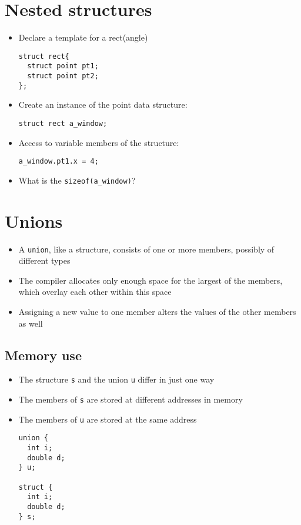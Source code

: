 \documentclass{article}
\begin{document}
\section{Nested structures}
\begin{itemize}
\item Declare a template for a rect(angle)
\begin{verbatim}
struct rect{
  struct point pt1;
  struct point pt2;
};
\end{verbatim}

\item Create an instance of the point data structure:
\begin{verbatim}
struct rect a_window;
\end{verbatim}

\item Access to variable members of the structure:
\begin{verbatim}
a_window.pt1.x = 4;
\end{verbatim}

\item What is the \verb!sizeof(a_window)!?
\end{itemize}




\section{Unions}
\begin{itemize}
\item A \verb!union!, like a structure, consists of one or more members, possibly of different types

\item The compiler allocates only enough space for the largest of the members, which overlay each other within this space

\item Assigning a new value to one member alters the values of the other members as well
\end{itemize}



\subsection{Memory use}
\begin{itemize}
\item The structure \verb!s! and the union \verb!u! differ in just one way
\item The members of \verb!s! are stored at different addresses in memory
\item The members of \verb!u! are stored at the same address

\begin{verbatim}
union {
  int i;
  double d;
} u;

struct {
  int i;
  double d;
} s;
\end{verbatim}
\end{itemize}
\end{document}
